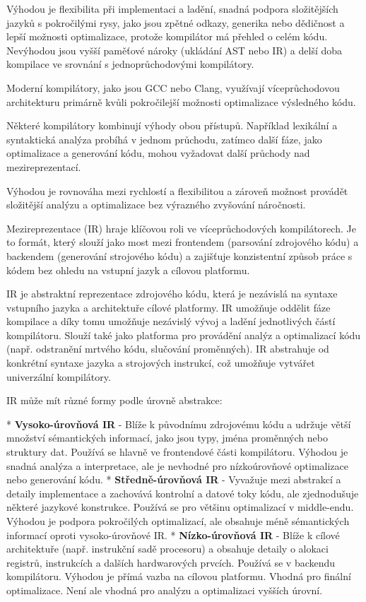 Výhodou je flexibilita při implementaci a ladění, snadná podpora složitějších jazyků s pokročilými rysy, jako jsou zpětné odkazy, generika nebo dědičnost a lepší možnosti optimalizace, protože kompilátor má přehled o celém kódu. Nevýhodou jsou vyšší paměťové nároky (ukládání AST nebo IR) a delší doba kompilace ve srovnání s jednoprůchodovými kompilátory.

Moderní kompilátory, jako jsou GCC nebo Clang, využívají víceprůchodovou architekturu primárně kvůli pokročilejší možnosti optimalizace výsledného kódu.

Některé kompilátory kombinují výhody obou přístupů. Například lexikální a syntaktická analýza probíhá v jednom průchodu, zatímco další fáze, jako optimalizace a generování kódu, mohou vyžadovat další průchody nad mezireprezentací.

Výhodou je rovnováha mezi rychlostí a flexibilitou a zároveň možnost provádět složitější analýzu a optimalizace bez výrazného zvyšování náročnosti.

Mezireprezentace (IR) hraje klíčovou roli ve víceprůchodových kompilátorech. Je to formát, který slouží jako most mezi frontendem (parsování zdrojového kódu) a backendem (generování strojového kódu) a zajišťuje konzistentní způsob práce s kódem bez ohledu na vstupní jazyk a cílovou platformu. 

IR je abstraktní reprezentace zdrojového kódu, která je nezávislá na syntaxe vstupního jazyka a architektuře cílové platformy. IR umožňuje oddělit fáze kompilace a díky tomu umožňuje nezávislý vývoj a ladění jednotlivých částí kompilátoru. Slouží také jako platforma pro provádění analýz a optimalizací kódu (např. odstranění mrtvého kódu, slučování proměnných). IR abstrahuje od konkrétní syntaxe jazyka a strojových instrukcí, což umožňuje vytvářet univerzální kompilátory.

IR může mít různé formy podle úrovně abstrakce:

\begitems
* {\bf Vysoko-úrovňová IR} - Blíže k původnímu zdrojovému kódu a udržuje větší množství sémantických informací, jako jsou typy, jména proměnných nebo struktury dat. Používá se hlavně ve frontendové části kompilátoru. Výhodou je snadná analýza a interpretace, ale je nevhodné pro nízkoúrovňové optimalizace nebo generování kódu.
* {\bf Středně-úrovňová IR} - Vyvažuje mezi abstrakcí a detaily implementace a zachovává kontrolní a datové toky kódu, ale zjednodušuje některé jazykové konstrukce. Používá se pro většinu optimalizací v middle-endu. Výhodou je podpora pokročilých optimalizací, ale obsahuje méně sémantických informací oproti vysoko-úrovňové IR.
* {\bf Nízko-úrovňová IR} - Blíže k cílové architektuře (např. instrukční sadě procesoru) a obsahuje detaily o alokaci registrů, instrukcích a dalších hardwarových prvcích. Používá se v backendu kompilátoru. Výhodou je přímá vazba na cílovou platformu. Vhodná pro finální optimalizace. Není ale vhodná pro analýzu a optimalizaci vyšších úrovní.
\enditems

